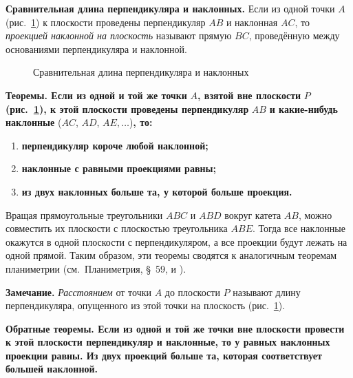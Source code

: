  \textbf{Сравнительная длина перпендикуляра и наклонных.} Если из одной точки \(A\) (рис.~\ref{fig:kiselev-stereo-312}) к плоскости проведены перпендикуляр \(AB\) и наклонная \(AC\), то \emph{проекцией наклонной на плоскость} называют прямую \(BC\), проведённую между основаниями перпендикуляра и наклонной.

\begin{figure}[htbp]
    \centering
    \renewcommand{\thefigure}{312}
    \captionsetup{name=Рис.,labelsep=period}
    
    \caption{Сравнительная длина перпендикуляра и наклонных}\label{fig:kiselev-stereo-312}
\end{figure}

\textbf{Теоремы. Если из одной и той же точки} \(A\)\textbf{, взятой вне плоскости} \(P\) \textbf{(рис.~\ref{fig:kiselev-stereo-312}), к этой плоскости проведены перпендикуляр} \(AB\) \textbf{и какие-нибудь наклонные} (\(AC\), \(AD\), \(AE,\ldots\))\textbf{, то:}

\begin{enumerate}[label=\arabic*),ref=\arabic*]
    \item \textbf{перпендикуляр короче любой наклонной;}
    \item\label{item:equal-projections-equal-obliques} \textbf{наклонные с равными проекциями равны;}
    \item \textbf{из двух наклонных больше та, у которой больше проекция.}
\end{enumerate}

Вращая прямоугольные треугольники \(ABC\) и \(ABD\) вокруг катета \(AB\), можно совместить их плоскости с плоскостью треугольника \(ABE\). Тогда все наклонные окажутся в одной плоскости с перпендикуляром, а все проекции будут лежать на одной прямой.
Таким образом, эти теоремы сводятся к аналогичным теоремам планиметрии (см.~Планиметрия, §~59,  и ).

\textbf{Замечание.} \emph{Расстоянием} от точки \(A\) до плоскости \(P\) называют длину перпендикуляра, опущенного из этой точки на плоскость (рис.~\ref{fig:kiselev-stereo-312}).

 \textbf{Обратные теоремы. Если из одной и той же точки вне плоскости провести к этой плоскости перпендикуляр и наклонные, то у равных наклонных проекции равны. Из двух проекций больше та, которая соответствует большей наклонной.}

